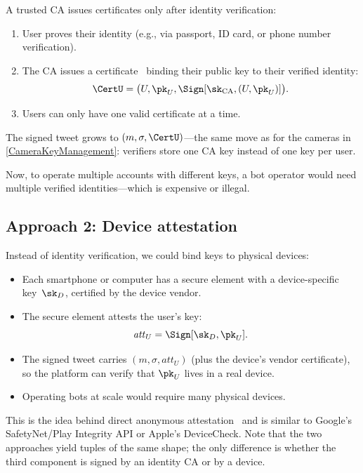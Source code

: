 A trusted \ac{CA} issues certificates only after
identity verification:
\begin{enumerate}
  \item User proves their identity (e.g., via passport, ID card, or
    phone number verification).
  \item The \ac{CA} issues a certificate~\autocite{Kohnfelder1978}
    binding their public key to their verified identity:
    \[
      \CertU = \bigl(U, \pk_U, \Sign[\sk_{\text{CA}}, (U, \pk_U)]\bigr).
    \]
  \item Users can only have one valid certificate at a time.
\end{enumerate}

The signed tweet grows to \((m, \sigma, \CertU)\)---the same move as for
the cameras in \cref{CameraKeyManagement}: verifiers store one \ac{CA}
key instead of one key per user.

Now, to operate multiple accounts with different keys, a bot operator
would need multiple verified identities---which is expensive or illegal.

\subsection{Approach 2: Device attestation}

Instead of identity verification, we could bind keys to physical devices:
\begin{itemize}
  \item Each smartphone or computer has a secure element with a
    device-specific key~\(\sk_D\), certified by the device vendor.
  \item The secure element attests the user's key:
    \[
      \mathit{att}_U = \Sign[\sk_D, \pk_U].
    \]
  \item The signed tweet carries \((m, \sigma, \mathit{att}_U)\) (plus
    the device's vendor certificate), so the platform can verify that
    \(\pk_U\) lives in a real device.
  \item Operating bots at scale would require many physical devices.
\end{itemize}

This is the idea behind direct anonymous
attestation~\autocite{DirectAnonymousAttestation} and is similar to
Google's SafetyNet/Play Integrity API or Apple's DeviceCheck.
Note that the two approaches yield tuples of the same shape; the only
difference is whether the third component is signed by an identity
\ac{CA} or by a device.

